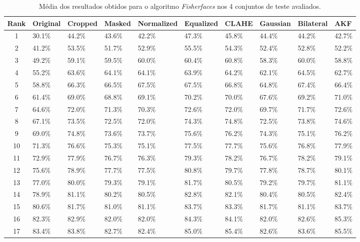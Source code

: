 \begin{table}[h]
    \begin{center}
    \caption{Média dos resultados obtidos para o algoritmo \textit{Fisherfaces} nos 4 conjuntos de teste avaliados.}	
	\begin{tabular}{c|p{1.2cm}p{1.1cm}p{1.1cm}p{1.7cm}p{1.5cm}p{1.2cm}p{1.2cm}p{1.2cm}p{1.2cm}}
	Rank & Original & Cropped & Masked & Normalized & Equalized & CLAHE & Gaussian & Bilateral & AKF \\ 
	\hline\hline
	1 & 30.1\% & 44.2\% & 43.6\% & 42.2\% & 47.3\% & 45.8\% & 44.4\% & 44.2\% & 42.7\% \\ 
	2 & 41.2\% & 53.5\% & 51.7\% & 52.9\% & 55.5\% & 54.3\% & 52.4\% & 52.8\% & 52.2\% \\ 
	3 & 49.2\% & 59.1\% & 59.5\% & 60.0\% & 60.4\% & 60.8\% & 58.3\% & 60.0\% & 58.8\% \\ 
	4 & 55.2\% & 63.6\% & 64.1\% & 64.1\% & 63.9\% & 64.2\% & 62.1\% & 64.5\% & 62.7\% \\ 
	5 & 58.8\% & 66.3\% & 66.5\% & 67.5\% & 67.5\% & 66.8\% & 64.8\% & 67.4\% & 66.4\% \\ 
	6 & 61.4\% & 69.0\% & 68.8\% & 69.1\% & 70.2\% & 70.0\% & 67.6\% & 69.2\% & 71.0\% \\ 
	7 & 64.6\% & 72.0\% & 71.3\% & 70.3\% & 72.6\% & 72.0\% & 69.7\% & 71.7\% & 72.6\% \\ 
	8 & 67.1\% & 73.5\% & 72.5\% & 72.0\% & 74.3\% & 74.8\% & 72.5\% & 73.8\% & 74.6\% \\ 
	9 & 69.0\% & 74.8\% & 73.6\% & 73.7\% & 75.6\% & 76.2\% & 74.3\% & 75.1\% & 76.2\% \\ 
	10 & 71.3\% & 76.6\% & 75.3\% & 75.1\% & 77.5\% & 77.7\% & 75.6\% & 76.8\% & 77.9\% \\ 
	11 & 72.9\% & 77.9\% & 76.7\% & 76.3\% & 79.3\% & 78.2\% & 76.7\% & 78.2\% & 79.1\% \\ 
	12 & 75.6\% & 78.9\% & 77.7\% & 77.5\% & 80.8\% & 79.7\% & 77.8\% & 78.7\% & 80.1\% \\ 
	13 & 77.0\% & 80.0\% & 79.3\% & 79.1\% & 81.7\% & 80.5\% & 79.2\% & 79.7\% & 81.1\% \\ 
	14 & 78.9\% & 81.1\% & 80.2\% & 80.5\% & 82.8\% & 82.1\% & 80.4\% & 80.5\% & 82.4\% \\ 
	15 & 80.6\% & 81.7\% & 81.0\% & 81.1\% & 83.7\% & 83.3\% & 81.7\% & 81.1\% & 83.7\% \\ 
	16 & 82.3\% & 82.9\% & 82.0\% & 82.0\% & 84.3\% & 84.1\% & 82.0\% & 82.6\% & 85.3\% \\ 
	17 & 83.4\% & 83.8\% & 82.7\% & 82.4\% & 85.0\% & 85.4\% & 82.6\% & 83.6\% & 85.5\% \\ 

\end{tabular}
\end{center}
\end{table}
